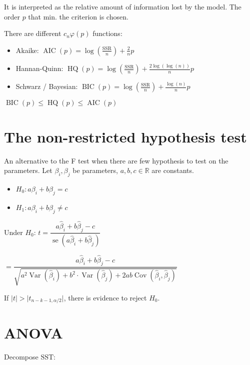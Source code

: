 \documentclass[10pt, a4paper, landscape]{article}
\DeclareMathOperator{\Var}{Var}
\DeclareMathOperator{\se}{se}
\DeclareMathOperator{\Cov}{Cov}
\DeclareMathOperator{\AIC}{AIC}
\DeclareMathOperator{\HQ}{HQ}
\DeclareMathOperator{\BIC}{BIC}
\newcommand{\SSR}{\text{SSR}}
\newcommand{\SST}{\text{SST}}
\begin{document}
\begin{multicols}{3}
It is interpreted as the relative amount of information lost by the model. The order \( p \) that min. the criterion is chosen.

There are different \( c_{n} \varphi(p) \) functions:

\begin{itemize}[leftmargin=*]
	\item Akaike: \( \AIC(p) = \log(\frac{\SSR}{n}) + \frac{2}{n} p \)
	\item Hannan-Quinn: \( \HQ(p) = \log(\frac{\SSR}{n}) + \frac{2 \log(\log(n))}{n} p \)
	\item Schwarz / Bayesian: \( \BIC(p) = \log(\frac{\SSR}{n}) + \frac{\log(n)}{n} p \)
\end{itemize}

\( \BIC(p) \leq \HQ(p) \leq \AIC(p) \)

\section*{The non-restricted hypothesis test}

An alternative to the F test when there are few hypothesis to test on the parameters. Let \( \beta_{i}, \beta_{j} \) be parameters, \( a, b, c \in \mathbb{R} \) are constants.

\begin{itemize}[leftmargin=*]
	\item \( H_{0}: a \beta_{i} + b \beta_{j} = c \)
	\item \( H_{1}: a \beta_{i} + b \beta_{j} \neq c \)
\end{itemize}

\begin{center}
	Under \( H_{0} \): \quad
	\( t = \dfrac{a \hat{\beta}_{i} + b \hat{\beta}_{j} - c}{\se(a \hat{\beta}_{i} + b \hat{\beta}_{j})} \)

	\( = \dfrac{a \hat{\beta}_{i} + b \hat{\beta}_{j} - c}{\sqrt{a^{2} \Var(\hat{\beta}_{i}) + b^{2} \cdot \Var(\hat{\beta}_{j}) + 2 a b \Cov(\hat{\beta}_{i}, \hat{\beta}_{j})}} \)
\end{center}

If \( \lvert t \rvert > \lvert t_{n - k - 1, \alpha / 2} \rvert \), there is evidence to reject \( H_{0} \).

\section*{ANOVA}

Decompose \( \SST \):


\end{multicols}
\end{document}
